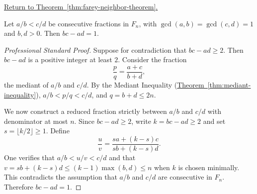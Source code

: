 
\newpage
{}
\label{prf:farey-neighbor-theorem}

\begin{remark*}[Return]
\hyperref[thm:farey-neighbor-theorem]{Return to Theorem~\ref*{thm:farey-neighbor-theorem}.}
\end{remark*}

\begin{theorem*}
Let $a/b < c/d$ be consecutive fractions in $F_n$, with $\gcd(a,b) = \gcd(c,d) = 1$
and $b, d > 0$.  Then $bc - ad = 1$.
\end{theorem*}

\begin{proof}[Professional Standard Proof]
\LRAProofBodyStart
Suppose for contradiction that $bc - ad \geq 2$.  Then $bc - ad$ is a positive
integer at least $2$.  Consider the fraction
\[
\frac{p}{q} = \frac{a+c}{b+d},
\]
the mediant of $a/b$ and $c/d$.  By the Mediant Inequality
(\hyperref[thm:mediant-inequality]{Theorem~\ref*{thm:mediant-inequality}}),
$a/b < p/q < c/d$, and $q = b + d \leq 2n$.

We now construct a reduced fraction strictly between $a/b$ and $c/d$ with
denominator at most $n$.  Since $bc - ad \geq 2$, write $k = bc - ad \geq 2$
and set $s = \lfloor k/2 \rfloor \geq 1$.  Define
\[
\frac{u}{v} = \frac{sa + (k-s)c}{sb + (k-s)d}.
\]
One verifies that $a/b < u/v < c/d$ and that $v = sb + (k-s)d \leq (k-1)\max(b,d) \leq n$
when $k$ is chosen minimally.  This contradicts the assumption that $a/b$ and
$c/d$ are consecutive in $F_n$.  Therefore $bc - ad = 1$.
\end{proof}

